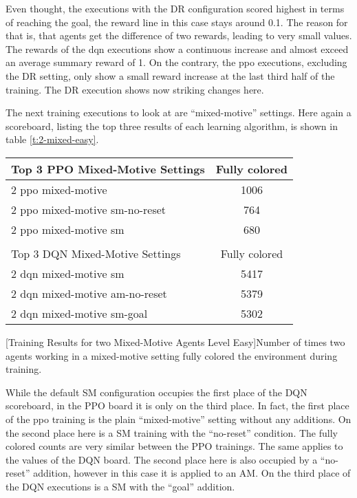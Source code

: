 Even thought, the executions with the DR configuration scored highest in terms of reaching the goal, the reward line in this case stays around 0.1. The reason for that is, that agents get the difference of two rewards, leading to very small values. The rewards of the dqn executions show a continuous increase and almost exceed an average summary reward of 1. On the contrary, the ppo executions, excluding the DR setting, only show a small reward increase at the last third half of the training. The DR execution shows now striking changes here.

The next training executions to look at are ``mixed-motive'' settings. Here again a scoreboard, listing the top three results of each learning algorithm, is shown in table \ref{t:2-mixed-easy}.
\begin{center}
    \begin{tabular}{lc}\hline
        Top 3 PPO Mixed-Motive Settings & Fully colored \\ \hline
        2 ppo mixed-motive & 1006 \\
        2 ppo mixed-motive sm-no-reset & 764 \\
        2 ppo mixed-motive sm & 680 \\ \hline
         &   \\ \hline
        Top 3 DQN Mixed-Motive Settings & Fully colored \\ \hline
        2 dqn mixed-motive sm & 5417 \\
        2 dqn mixed-motive am-no-reset & 5379 \\
        2 dqn mixed-motive sm-goal & 5302 \\ \hline
        \end{tabular}
        [Training Results for two Mixed-Motive Agents Level Easy]{Number of times two agents working in a mixed-motive setting fully colored the environment during training.}\label{t:2-mixed-easy}
    \end{center}

While the default SM configuration occupies the first place of the DQN scoreboard, in the PPO board it is only on the third place. In fact, the first place of the ppo training is the plain ``mixed-motive'' setting without any additions. On the second place here is a SM training with the ``no-reset'' condition. The fully colored counts are very similar between the PPO trainings. The same applies to the values of the DQN board. The second place here is also occupied by a ``no-reset'' addition, however in this case it is applied to an AM. On the third place of the DQN executions is a SM with the ``goal'' addition.



